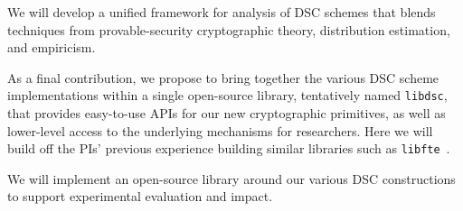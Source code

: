 \begin{task}
\label{task:unified-framework}
We will develop a unified framework for analysis of 
DSC schemes that
blends techniques from provable-security cryptographic theory, 
distribution estimation, and empiricism.
\end{task}


As a final contribution, we propose
to bring together the various DSC scheme implementations within a single  open-source library, tentatively 
named \texttt{libdsc}, that provides easy-to-use APIs for
our new cryptographic primitives, as well as lower-level access to the
underlying mechanisms for researchers. Here we will build off the PIs' previous experience 
building similar libraries such as \texttt{libfte}~\cite{luchaup2014libfte}. 

\begin{task}
\label{task:libdsc} We will implement an open-source library around our
various DSC constructions to support experimental evaluation and impact. 
\end{task}


\iffalse
We will finally specify appropriate fallback security notions to account for
situations in which the distribution models underlying new primitives are
unexpectedly poor, due either to failures in designer's empirical methodology,
to unforeseen advances in modeling, or simply due to mistakes in deployment.  A
well-engineered construction then will satisfy mainline DSC notions of security
given good distribution models and provide robust fallback security guarantees
in the event of poor ones. 
\fi





